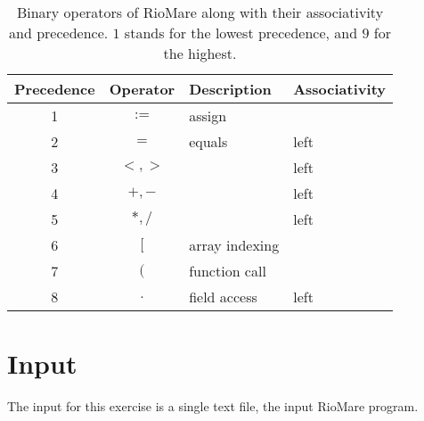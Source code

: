 \documentclass{article}
\begin{document}
\begin{table}[h]
\centering
\begin{tabular}{ |c|c|l|l| }
\hline
Precedence & Operator & Description & Associativity \\
\hline
\hline
1          & $:=$            & assign         &       \\
\hline
2          & $=$             & equals         & left  \\
\hline
3          & $<,>$           &                & left  \\
\hline
4          & $+,-$           &                & left  \\
\hline
5          & $*,/$           &                & left  \\
\hline
6          & $[$             & array indexing &       \\
\hline
7          & $($             & function call  &       \\
\hline
8          & $.$     & field access   & left          \\
\hline
\end{tabular}
\caption{
Binary operators of RioMare along with their associativity and precedence.
$1$ stands for the lowest precedence, and $9$ for the highest.
\label{Table_Binary_Operators_Of_RioMare}}
\end{table}
\section{Input}
The input for this exercise is a single text file, the input RioMare program.
\end{document}
